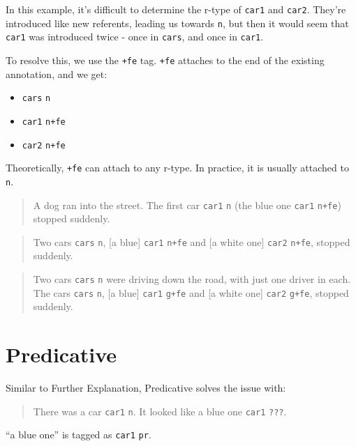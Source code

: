 \documentclass[
]{book}
\providecommand{\tightlist}{%
  \setlength{\itemsep}{0pt}\setlength{\parskip}{0pt}}
\begin{document}
In this example, it's difficult to determine the r-type of \texttt{car1} and \texttt{car2}.
They're introduced like new referents, leading us towards \texttt{n}, but then it would seem that \texttt{car1} was introduced twice -
once in \texttt{cars}, and once in \texttt{car1}.

To resolve this, we use the \texttt{+fe} tag.
\texttt{+fe} attaches to the end of the existing annotation, and we get:

\begin{itemize}
\tightlist
\item
  \texttt{cars} \texttt{n}
\item
  \texttt{car1} \texttt{n+fe}
\item
  \texttt{car2} \texttt{n+fe}
\end{itemize}

Theoretically, \texttt{+fe} can attach to any r-type. In practice, it is usually attached to \texttt{n}.

\begin{quote}
A dog ran into the street. The first car \texttt{car1} \texttt{n} (the blue one \texttt{car1} \texttt{n+fe}) stopped suddenly.
\end{quote}

\begin{quote}
Two cars \texttt{cars} \texttt{n},
{[}a blue{]} \texttt{car1} \texttt{n+fe} and {[}a white one{]} \texttt{car2} \texttt{n+fe},
stopped suddenly.
\end{quote}

\begin{quote}
Two cars \texttt{cars} \texttt{n} were driving down the road,
with just one driver in each.
The cars \texttt{cars} \texttt{n},
{[}a blue{]} \texttt{car1} \texttt{g+fe} and {[}a white one{]} \texttt{car2} \texttt{g+fe},
stopped suddenly.
\end{quote}

\hypertarget{predicative}{%
\section{Predicative}\label{predicative}}

Similar to Further Explanation, Predicative solves the issue with:

\begin{quote}
There was a car \texttt{car1} \texttt{n}. It looked like a blue one \texttt{car1} \texttt{???}.
\end{quote}

``a blue one'' is tagged as \texttt{car1} \texttt{pr}.
\end{document}
